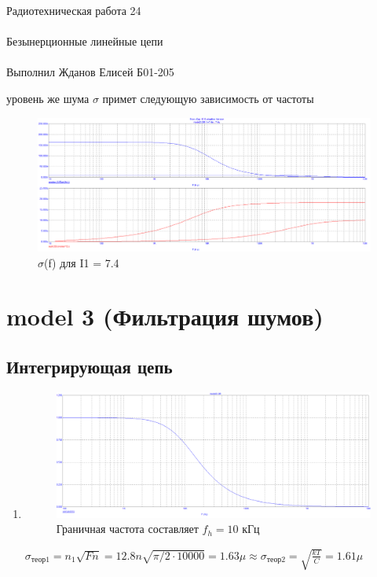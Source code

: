 \documentclass{astroedu-lab}
\begin{document}
\begin{problem}{\huge Радиотехническая работа 24\\\\Безынерционные линейные цепи\\\\Выполнил Жданов Елисей Б01-205}
\begin{enumerate}
уровень же шума $\sigma$ примет следующую зависимость от частоты

\begin{figure}[h!]
    \centering
    \includegraphics[scale=0.225]{images/cus_mod_2_2.png}
    \caption{$\sigma$(f) для I1 = 7.4}
    \label{fig:m23}
\end{figure}

\end{enumerate}

\newpage

\section{\textbf{model 3 (Фильтрация шумов)}}

\subsection*{Интегрирующая цепь}

\begin{enumerate}

\item

\begin{figure}[h!]
    \centering
    \includegraphics[scale=0.3]{images/mod3_1_1.png}
    \caption{Граничная частота составляет $f_h = 10$ кГц}
    \label{fig:m311}
\end{figure}

$\sigma_\text{теор1} = n_1\sqrt{Fn} = 12.8n\sqrt{\pi/2 \cdot 10000} = 1.63\mu \approx \sigma_\text{теор2} = \sqrt{\frac{kT}{C}} = 1.61\mu$


\end{enumerate}
\end{problem}
\end{document}
